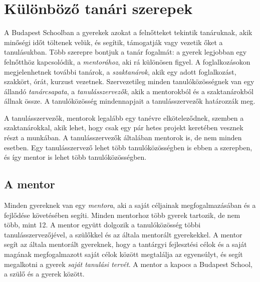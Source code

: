 \hypertarget{kulonbozo-tanari-szerepek}{%
\section{Különböző tanári szerepek}\label{kulonbozo-tanari-szerepek}}

A Budapest Schoolban a gyerekek azokat a felnőtteket tekintik
tanáruknak, akik minőségi időt töltenek velük, és segítik, támogatják
vagy vezetik őket a tanulásukban. Több szerepre bontjuk a tanár
fogalmát: a gyerek legjobban egy felnőtthöz kapcsolódik, a
\emph{mentorához}, aki rá különösen figyel. A foglalkozásokon
megjelenhetnek további tanárok, a \emph{szaktanárok}, akik egy adott
foglalkozást, szakkört, órát, kurzust vezetnek. Szervezetileg minden
tanulóközösségnek van egy állandó \emph{tanárcsapata}, a
\emph{tanulásszervezők}, akik a mentorokból és a szaktanárokból állnak
össze. A tanulóközösség mindennapjait a tanulásszervezők határozzák meg.

A tanulásszervezők, mentorok legalább egy tanévre elköteleződnek,
szemben a szaktanárokkal, akik lehet, hogy csak egy pár hetes projekt
keretében vesznek részt a munkában. A tanulásszervezők általában
mentorok is, de nem minden esetben. Egy tanulásszervező lehet több
tanulóközösségben is ebben a szerepben, és így mentor is lehet több
tanulóközösségben.

\hypertarget{mentor}{%
\subsection{A mentor}\label{mentor}}

Minden gyereknek van egy \emph{mentora}, aki a saját céljainak
megfogalmazásában és a fejlődése követésében segíti. Minden mentorhoz
több gyerek tartozik, de nem több, mint 12. A mentor együtt dolgozik a
tanulóközösség többi tanulásszervezőjével, a szülőkkel és az általa
mentorált gyerekekkel. A mentor segít az általa mentorált gyereknek,
hogy a tantárgyi fejlesztési célok és a saját magának megfogalmazott
saját célok között megtalálja az egyensúlyt, és segít megalkotni a
gyerek \emph{saját tanulási tervét}. A mentor a kapocs a Budapest School, a szülő és a gyerek között.

